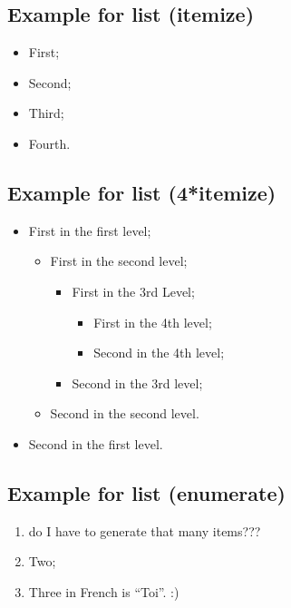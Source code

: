 \documentclass[a4paper, 11pt, twoside]{report}
\begin{document}
\subsection{Example for list (itemize)}
\begin{itemize}
    \item First;
    \item Second;
    \item Third;
    \item Fourth.
\end{itemize}

\subsection*{Example for list (4*itemize)}
\begin{itemize}
    \item First in the first level;
        \begin{itemize}
            \item First in the second level;
                \begin{itemize}
                    \item First in the 3rd Level;
                        \begin{itemize}
                            \item First in the 4th level;
                            \item Second in the 4th level;
                        \end{itemize}
                    \item Second in the 3rd level;
                \end{itemize}
            \item Second in the second level.
        \end{itemize}
    \item Second in the first level.
\end{itemize}

\subsection{Example for list (enumerate)}
\begin{enumerate}
    \item do I have to generate that many items???
    \item Two;
    \item Three in French is ``Toi''. :)
\end{enumerate}
\end{document}
